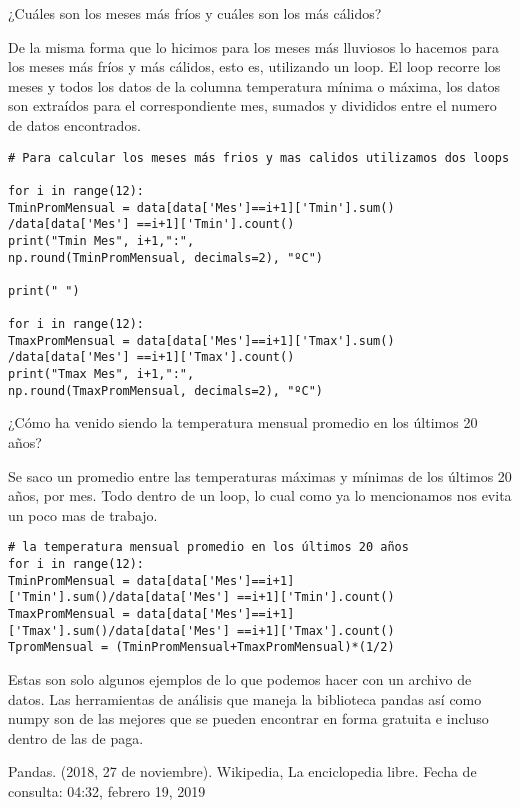 \documentclass[12pt,a4paper]{article}
\begin{document}
¿Cuáles son los meses más fríos y cuáles son los más cálidos?

\noindent De la misma forma que lo hicimos para los meses más lluviosos lo hacemos para los meses más fríos y más cálidos, esto es, utilizando un loop. El loop recorre los meses y todos los datos de la columna temperatura mínima o máxima, los datos son extraídos para el correspondiente mes, sumados y divididos entre el numero de datos encontrados.

\begin{verbatim}
# Para calcular los meses más frios y mas calidos utilizamos dos loops

for i in range(12):
TminPromMensual = data[data['Mes']==i+1]['Tmin'].sum()
/data[data['Mes'] ==i+1]['Tmin'].count()
print("Tmin Mes", i+1,":", 
np.round(TminPromMensual, decimals=2), "ºC")
  
print(" ")
    
for i in range(12):
TmaxPromMensual = data[data['Mes']==i+1]['Tmax'].sum()
/data[data['Mes'] ==i+1]['Tmax'].count()
print("Tmax Mes", i+1,":", 
np.round(TmaxPromMensual, decimals=2), "ºC")
\end{verbatim}


¿Cómo ha venido siendo la temperatura mensual promedio en los últimos 20 años? 

\noindent Se saco un promedio entre las temperaturas máximas y mínimas de los últimos 20 años, por mes. Todo dentro de un loop, lo cual como ya lo mencionamos nos evita un poco mas de trabajo.

\begin{verbatim}
# la temperatura mensual promedio en los últimos 20 años 
for i in range(12):
TminPromMensual = data[data['Mes']==i+1]['Tmin'].sum()/data[data['Mes'] ==i+1]['Tmin'].count()
TmaxPromMensual = data[data['Mes']==i+1]['Tmax'].sum()/data[data['Mes'] ==i+1]['Tmax'].count()
TpromMensual = (TminPromMensual+TmaxPromMensual)*(1/2)
\end{verbatim}

Estas son solo algunos ejemplos de lo que podemos hacer con un archivo de datos. Las herramientas de análisis que maneja la biblioteca pandas así como numpy son de las mejores que se pueden encontrar en forma gratuita e incluso dentro de las de paga.



\begin{thebibliography}{0}


Pandas. (2018, 27 de noviembre). Wikipedia, La enciclopedia libre. Fecha de consulta: 04:32, febrero 19, 2019  




\end{thebibliography}
\end{document}
